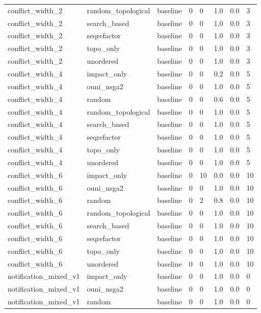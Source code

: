 \begin{table}[t]
\begin{tabular}{llllllll}
conflict\_width\_2 & random\_topological & baseline & 0 & 0 & 1.0 & 0.0 & 3 \\
conflict\_width\_2 & search\_based & baseline & 0 & 0 & 1.0 & 0.0 & 3 \\
conflict\_width\_2 & seqrefactor & baseline & 0 & 0 & 1.0 & 0.0 & 3 \\
conflict\_width\_2 & topo\_only & baseline & 0 & 0 & 1.0 & 0.0 & 3 \\
conflict\_width\_2 & unordered & baseline & 0 & 0 & 1.0 & 0.0 & 3 \\
conflict\_width\_4 & impact\_only & baseline & 0 & 0 & 0.2 & 0.0 & 5 \\
conflict\_width\_4 & ouni\_nsga2 & baseline & 0 & 0 & 1.0 & 0.0 & 5 \\
conflict\_width\_4 & random & baseline & 0 & 0 & 0.6 & 0.0 & 5 \\
conflict\_width\_4 & random\_topological & baseline & 0 & 0 & 1.0 & 0.0 & 5 \\
conflict\_width\_4 & search\_based & baseline & 0 & 0 & 1.0 & 0.0 & 5 \\
conflict\_width\_4 & seqrefactor & baseline & 0 & 0 & 1.0 & 0.0 & 5 \\
conflict\_width\_4 & topo\_only & baseline & 0 & 0 & 1.0 & 0.0 & 5 \\
conflict\_width\_4 & unordered & baseline & 0 & 0 & 1.0 & 0.0 & 5 \\
conflict\_width\_6 & impact\_only & baseline & 0 & 10 & 0.0 & 0.0 & 10 \\
conflict\_width\_6 & ouni\_nsga2 & baseline & 0 & 0 & 1.0 & 0.0 & 10 \\
conflict\_width\_6 & random & baseline & 0 & 2 & 0.8 & 0.0 & 10 \\
conflict\_width\_6 & random\_topological & baseline & 0 & 0 & 1.0 & 0.0 & 10 \\
conflict\_width\_6 & search\_based & baseline & 0 & 0 & 1.0 & 0.0 & 10 \\
conflict\_width\_6 & seqrefactor & baseline & 0 & 0 & 1.0 & 0.0 & 10 \\
conflict\_width\_6 & topo\_only & baseline & 0 & 0 & 1.0 & 0.0 & 10 \\
conflict\_width\_6 & unordered & baseline & 0 & 0 & 1.0 & 0.0 & 10 \\
notification\_mixed\_v1 & impact\_only & baseline & 0 & 0 & 1.0 & 0.0 & 0 \\
notification\_mixed\_v1 & ouni\_nsga2 & baseline & 0 & 0 & 1.0 & 0.0 & 0 \\
notification\_mixed\_v1 & random & baseline & 0 & 0 & 1.0 & 0.0 & 0 \\

\end{tabular}
\end{table}
